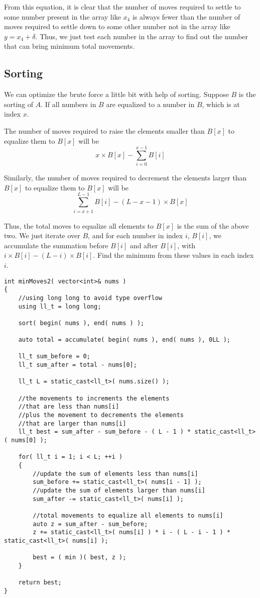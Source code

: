 From this equation, it is clear that the number of moves required to settle to some number present in the array like $x_4$   is always fewer than the number of moves required to settle down to some other number not in the array like $y = x_4 + \delta$. Thus, we just test each number in the array to find out the number that can bring minimum total movements.

\subsection{Sorting}
We can optimize the brute force a little bit with help of sorting. Suppose $B$ is the sorting of $A$. If all numbers in $B$ are equalized to a number in $B$, which is at index $x$.

The number of moves required to raise the elements smaller than $B[x]$ to equalize them to $B[x]$ will be 
\[
x \times B[x] - \sum\limits_{i = 0}^{x-1}B[i]
\]

Similarly, the number of moves required to  decrement the elements larger than $B[x]$ to equalize them to $B[x]$ will be
\[
\sum\limits_{i = x+1}^{L-1}B[i] - (L-x-1)\times B[x]
\]

Thus, the total moves to equalize all elements to $B[x]$ is the sum of the above two. We just iterate over $B$, and for each number in index $i$, $B[i]$, we accumulate the summation before $B[i]$ and after $B[i]$, with $i\times B[i] - (L-i)\times B[i]$. Find the minimum from these values in each index $i$.

\setcounter{lstlisting}{0}
\begin{lstlisting}[style=customc, caption={Sorting}]
int minMoves2( vector<int>& nums )
{
    //using long long to avoid type overflow
    using ll_t = long long;

    sort( begin( nums ), end( nums ) );

    auto total = accumulate( begin( nums ), end( nums ), 0LL );

    ll_t sum_before = 0;
    ll_t sum_after = total - nums[0];

    ll_t L = static_cast<ll_t>( nums.size() );

    //the movements to increments the elements
    //that are less than nums[i]
    //plus the movement to decrements the elements
    //that are larger than nums[i]
    ll_t best = sum_after - sum_before - ( L - 1 ) * static_cast<ll_t>( nums[0] );

    for( ll_t i = 1; i < L; ++i )
    {
        //update the sum of elements less than nums[i]
        sum_before += static_cast<ll_t>( nums[i - 1] );
        //update the sum of elements larger than nums[i]
        sum_after -= static_cast<ll_t>( nums[i] );

        //total movements to equalize all elements to nums[i]
        auto z = sum_after - sum_before;
        z += static_cast<ll_t>( nums[i] ) * i - ( L - i - 1 ) * static_cast<ll_t>( nums[i] );

        best = ( min )( best, z );
    }

    return best;
}
\end{lstlisting}

